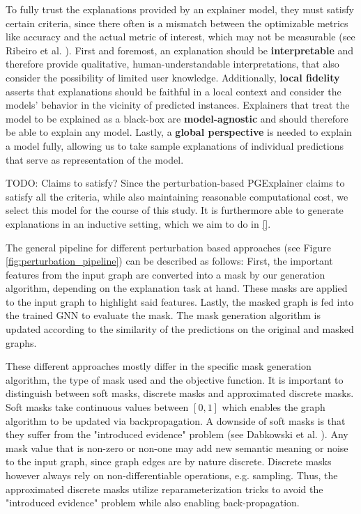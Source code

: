 To fully trust the explanations provided by an explainer model, they must satisfy certain criteria, since there often is a mismatch between the optimizable metrics like accuracy and the actual metric of interest, which may not be measurable (see Ribeiro et al. \cite{ribeiro2016should}). First and foremost, an explanation should be \textbf{interpretable} and therefore provide qualitative, human-understandable interpretations, that also consider the possibility of limited user knowledge. Additionally, \textbf{local fidelity} asserts that explanations should be faithful in a local context and consider the models' behavior in the vicinity of predicted instances. Explainers that treat the model to be explained as a black-box are \textbf{model-agnostic} and should therefore be able to explain any model. Lastly, a \textbf{global perspective} is needed to explain a model fully, allowing us to take sample explanations of individual predictions that serve as representation of the model.

TODO: Claims to satisfy?
Since the perturbation-based PGExplainer \cite{luo2020parameterized} claims to satisfy all the criteria, while also maintaining reasonable computational cost, we select this model for the course of this study. It is furthermore able to generate explanations in an inductive setting, which we aim to do in \ref{}.

The general pipeline for different perturbation based approaches (see Figure \ref{fig:perturbation_pipeline}) can be described as follows: First, the important features from the input graph are converted into a mask by our generation algorithm, depending on the explanation task at hand. These masks are applied to the input graph to highlight said features. Lastly, the masked graph is fed into the trained GNN to evaluate the mask. The mask generation algorithm is updated according to the similarity of the predictions on the original and masked graphs. 

These different approaches mostly differ in the specific mask generation algorithm, the type of mask used and the objective function. It is important to distinguish between soft masks, discrete masks and approximated discrete masks. Soft masks take continuous values between $[0,1]$ which enables the graph algorithm to be updated via backpropagation. A downside of soft masks is that they suffer from the "introduced evidence" problem (see Dabkowski et al. \cite{dabkowski2017real}). Any mask value that is non-zero or non-one may add new semantic meaning or noise to the input graph, since graph edges are by nature discrete. Discrete masks however always rely on non-differentiable operations, e.g. sampling. Thus, the approximated discrete masks utilize reparameterization tricks to avoid the "introduced evidence" problem while also enabling back-propagation. %

